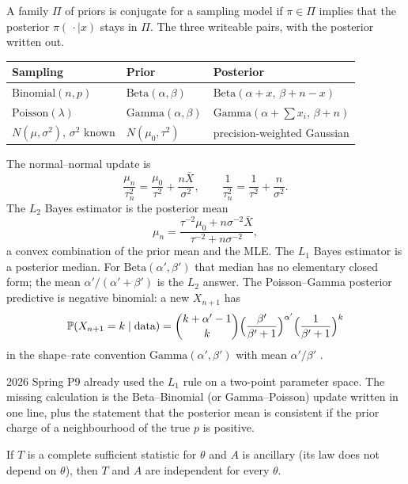 \begin{definition}
\label{def:conj}
A family \(\Pi\) of priors is conjugate for a sampling model if \(\pi\in\Pi\) implies that the posterior \(\pi(\,\cdot\mid x)\) stays in \(\Pi\). The three writeable pairs, with the posterior written out.

\begin{center}
\begin{tabular}{@{}lll@{}}
\toprule
Sampling & Prior & Posterior \\
\midrule
\(\mathrm{Binomial}(n,p)\) & \(\mathrm{Beta}(\alpha,\beta)\) & \(\mathrm{Beta}(\alpha+x,\,\beta+n-x)\) \\
\(\mathrm{Poisson}(\lambda)\) & \(\mathrm{Gamma}(\alpha,\beta)\) & \(\mathrm{Gamma}(\alpha+\sum x_{i},\,\beta+n)\) \\
\(N(\mu,\sigma^{2})\), \(\sigma^{2}\) known & \(N(\mu_{0},\tau^{2})\) & precision-weighted Gaussian \\
\bottomrule
\end{tabular}
\end{center}

The normal--normal update is
\[
\frac{\mu_{n}}{\tau_{n}^{2}}
=
\frac{\mu_{0}}{\tau^{2}}+\frac{n\bar X}{\sigma^{2}},
\qquad
\frac{1}{\tau_{n}^{2}}
=
\frac{1}{\tau^{2}}+\frac{n}{\sigma^{2}}.
\]
The \(L_{2}\) Bayes estimator is the posterior mean
\[
\mu_{n}
=
\frac{\tau^{-2}\mu_{0}+n\sigma^{-2}\bar X}{\tau^{-2}+n\sigma^{-2}},
\]
a convex combination of the prior mean and the MLE. The \(L_{1}\) Bayes estimator is a posterior median. For \(\mathrm{Beta}(\alpha',\beta')\) that median has no elementary closed form; the mean \(\alpha'/(\alpha'+\beta')\) is the \(L_{2}\) answer. The Poisson--Gamma posterior predictive is negative binomial: a new \(X_{n+1}\) has
\[
\mathbb{P}(X_{n+1}=k\mid\text{data})
=
\binom{k+\alpha'-1}{k}
\Bigl(\frac{\beta'}{\beta'+1}\Bigr)^{\alpha'}
\Bigl(\frac{1}{\beta'+1}\Bigr)^{k}
\]
in the shape--rate convention \(\mathrm{Gamma}(\alpha',\beta')\) with mean \(\alpha'/\beta'\) \cite{gelman13}.
\end{definition}

2026 Spring P9 already used the \(L_{1}\) rule on a two-point parameter space. The missing calculation is the Beta--Binomial (or Gamma--Poisson) update written in one line, plus the statement that the posterior mean is consistent if the prior charge of a neighbourhood of the true \(p\) is positive.

\begin{theorem}[Basu]
\label{thm:basu}
If \(T\) is a complete sufficient statistic for \(\theta\) and \(A\) is ancillary (its law does not depend on \(\theta\)), then \(T\) and \(A\) are independent for every \(\theta\).
\end{theorem}

